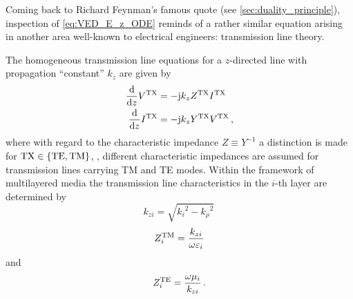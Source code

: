 Coming back to Richard Feynman's famous quote (see
\cref{sec:duality_principle}), inspection of \eqref{eq:VED_E_z_ODE} reminds of
a rather similar equation arising in another area well-known to electrical
engineers: transmission line theory.



The homogeneous transmission line equations for a $z$-directed line with
propagation \enquote{constant} $k_z$ are given by
\cite{Felsen1994,Michalski2016b}
\begin{subequations}\label{eq:tl_ode_system}
	\begin{align}
		\frac{\mathrm{d}}{\mathrm{d} z}
		V^{\mathrm{TX}}
		&=
		-\mathrm{j}
		k_z
		Z^{\mathrm{TX}}
		I^{\mathrm{TX}}
		\label{eq:tl_ode_system_dV}
		\\
		\frac{\mathrm{d}}{\mathrm{d} z}
		I^{\mathrm{TX}}
		&=
		-\mathrm{j}
		k_z
		Y^{\mathrm{TX}}
		V^{\mathrm{TX}}
		\label{eq:tl_ode_system_dI}
		\, ,
	\end{align}
\end{subequations}
where with regard to the characteristic impedance $Z \equiv Y^{-1}$ a
distinction is made for $\mathrm{TX} \in \left\{\mathrm{TE},\mathrm{TM}\right\}$, \ie, different
characteristic impedances are assumed for transmission lines carrying
\ac{TM} and \ac{TE} modes.
Within the framework of multilayered media the transmission line
characteristics in the $i$-th layer are determined by \cite{Michalski2016b}
\begin{equation}
	k_{zi} = \sqrt{{k_i}^2 - {k_\rho}^2}
	\,
\end{equation}
\begin{equation}
	Z_i^{\mathrm{TM}} = \frac{k_{zi}}{\omega \varepsilon_i}
\end{equation}
and
\begin{equation}
	Z_i^{\mathrm{TE}} = \frac{\omega \mu_i}{k_{zi}}
	\, .
\end{equation}

